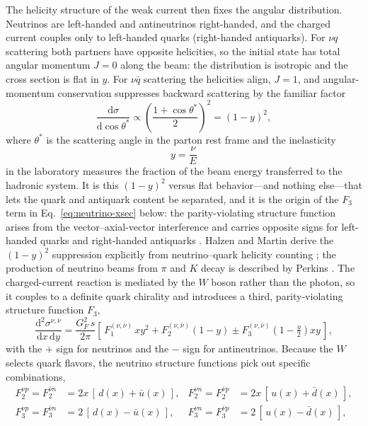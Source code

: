 The helicity structure of the weak current then fixes the angular distribution. Neutrinos
are left-handed and antineutrinos right-handed, and the charged current couples only to
left-handed quarks (right-handed antiquarks). For $\nu q$ scattering both partners have
opposite helicities, so the initial state has total angular momentum $J=0$ along the beam:
the distribution is isotropic and the cross section is flat in $y$. For $\nu\bar q$
scattering the helicities align, $J=1$, and angular-momentum conservation suppresses
backward scattering by the familiar factor
\begin{equation}
    \frac{\mathrm{d}\sigma}{\mathrm{d}\cos\theta^{*}} \propto
    \left(\frac{1+\cos\theta^{*}}{2}\right)^{\!2} = (1-y)^{2},
    \label{eq:helicity-suppression}
\end{equation}
where $\theta^{*}$ is the scattering angle in the parton rest frame and the inelasticity
\begin{equation}
    y = \frac{\nu}{E}
    \label{eq:y-lab}
\end{equation}
in the laboratory measures the fraction of the beam energy transferred to the hadronic
system. It is this $(1-y)^{2}$ versus flat behavior---and nothing else---that lets the
quark and antiquark content be separated, and it is the origin of the $F_{3}$ term in
Eq.~\eqref{eq:neutrino-xsec} below: the parity-violating structure function arises from
the vector--axial-vector interference and carries opposite signs for left-handed quarks
and right-handed antiquarks \cite[Ch.~4.3]{ThomasWeise2001}. Halzen and Martin derive the
$(1-y)^{2}$ suppression explicitly from neutrino--quark helicity counting
\cite[Ch.~12]{HalzenMartin1984}; the production of neutrino beams from $\pi$ and $K$ decay
is described by Perkins \cite[Ch.~11]{Perkins2000}. The charged-current reaction is mediated by the $W$
boson rather than the photon, so it couples to a definite quark chirality and introduces
a third, parity-violating structure function $F_{3}$,
\begin{equation}
    \frac{\mathrm{d}^{2}\sigma^{\nu,\bar\nu}}{\mathrm{d}x\,\mathrm{d}y}
    = \frac{G_{F}^{2}\,s}{2\pi}
      \left[\,F_{1}^{(\nu,\bar\nu)}\,x y^{2}
      + F_{2}^{(\nu,\bar\nu)}(1-y)
      \pm F_{3}^{(\nu,\bar\nu)}\left(1-\tfrac{y}{2}\right)x y\,\right],
    \label{eq:neutrino-xsec}
\end{equation}
with the $+$ sign for neutrinos and the $-$ sign for antineutrinos. Because the $W$
selects quark flavors, the neutrino structure functions pick out specific combinations,
\begin{align}
    F_{2}^{\nu p} = F_{2}^{\bar\nu n} &= 2x\,[\,d(x) + \bar u(x)\,],
    & F_{2}^{\nu n} = F_{2}^{\bar\nu p} &= 2x\,[\,u(x) + \bar d(x)\,],
    \label{eq:F2-neutrino}\\
    F_{3}^{\nu p} = F_{3}^{\bar\nu n} &= 2\,[\,d(x) - \bar u(x)\,],
    & F_{3}^{\nu n} = F_{3}^{\bar\nu p} &= 2\,[\,u(x) - \bar d(x)\,],
    \label{eq:F3-neutrino}
\end{align}
